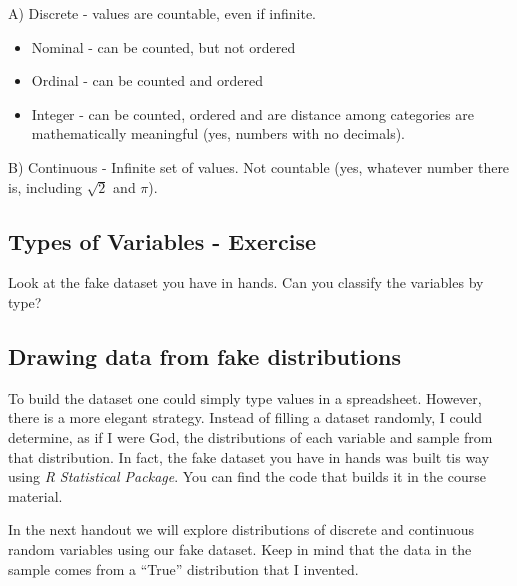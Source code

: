 \documentclass[11pt]{article}
\begin{document}
	A) Discrete - values are countable, even if infinite.
	
	\begin{itemize}
		\item Nominal - can be counted, but not ordered
		\item Ordinal - can be counted and ordered
		\item Integer - can be counted, ordered and are distance among categories are mathematically meaningful (yes, numbers with no decimals).
	\end{itemize}
	
	B) Continuous - Infinite set of values. Not countable (yes, whatever number there is, including $\sqrt{2} $ and $\pi$). \\

	\subsection*{Types of Variables - Exercise}

	Look at the fake dataset you have in hands. Can you classify the variables by type?

	\subsection*{Drawing data from fake distributions}
	
	To build the dataset one could simply type values in a spreadsheet. However, there is a more elegant strategy. Instead of filling a dataset randomly, I could determine, as if I were God, the distributions of each variable and sample from that distribution. In fact, the fake dataset you have in hands was built tis way using \emph{R Statistical Package}. You can find the code that builds it in the course material.
	
	In the next handout we will explore distributions of discrete and continuous random variables using our fake dataset. Keep in mind that the data in the sample comes from a ``True'' distribution that I invented.
	
\end{document}

